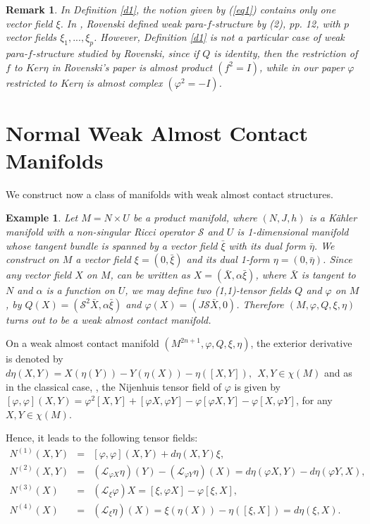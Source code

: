 \documentclass{article}
\newtheorem{example}[theorem]{Example}
\newtheorem{remark}[theorem]{Remark}
\begin{document}
\begin{remark}
 In Definition \ref{d1},  the notion given by (\ref{eq1}) contains only one vector field $\xi$. In \cite{Rov55}, Rovenski  defined  weak para-$f$-structure by (2), pp. 12, with $p$ vector fields $\xi_1, ..., \xi_p$. However, Definition \ref{d1} is not a particular case of weak para-$f$-structure studied by Rovenski, since if $Q$ is identity, then the restriction of $f$ to $Ker \eta$ in Rovenski's paper  is almost product $(f^2 = I)$, while in our paper $\varphi$ restricted to $Ker \eta$ is almost complex $(\varphi ^2 = - I)$.	
\end{remark} 









\section{Normal Weak Almost Contact Manifolds}
\noindent We construct now a class of manifolds with weak almost contact structures.

\begin{example} \label{ex1}
	Let $M=N\times U$ be a product manifold, where $(N,J,h)$ is a K\"{a}hler manifold with a non-singular Ricci operator $\mathcal{S}$ and $U$ is 1-dimensional manifold whose tangent bundle is spanned by a vector field ${\bar{\xi}}$ with its dual form $\bar{\eta}$. We construct on $M$ a vector field $\xi=(0,\bar{\xi})$ and its dual 1-form $\eta=(0,\bar{\eta})$. Since any vector field $X$ on $M$, can be written as $X=(\bar{X},\alpha\bar{\xi})$, where $\bar{X}$ is tangent to $N$ and $\alpha$ is a function on $U$, we may define two (1,1)-tensor fields $Q$ and $\varphi$ on $M$, by $Q (X)=(\mathcal{S}^2\bar{X},\alpha\bar{\xi})$ and $\varphi (X)=(J\mathcal{S}\bar{X},0)$. Therefore $(M,\varphi,Q,\xi,\eta)$ turns out to be a weak almost contact manifold.	
\end{example} 

On a weak almost contact manifold $(M^{2n+1},\varphi,Q,\xi,\eta)$, the exterior derivative is denoted by $d\eta(X,Y)=X(\eta(Y))-Y(\eta(X))-\eta([X,Y]), \ \ X,Y\in\chi(M)$ and as in the classical case, \cite{Blair},  the Nijenhuis tensor field of $\varphi$ is given by $[\varphi,\varphi](X,Y)=\varphi^2[X,Y]+[\varphi X,\varphi Y]-\varphi[\varphi X,Y]-\varphi[X,\varphi Y]$, for any $ X,Y\in\chi(M)$. \medskip

Hence, it leads to the following tensor fields:
\begin{eqnarray}
		N^{(1)}(X,Y)&=&[\varphi,\varphi](X,Y)+d\eta(X,Y)\xi,  \label{n1}\\
		 N^{(2)}(X,Y)&=& (\mathcal{L}_{\varphi X}\eta)(Y)-(\mathcal{L}_{\varphi Y}\eta)(X)=d\eta(\varphi X,Y)-d\eta(\varphi Y,X), \label{n2}\\
		 N^{(3)}(X)&=& (\mathcal{L}_{\xi}\varphi)X=[\xi,\varphi X]-\varphi[\xi,X], \label{n3}\\
		 N^{(4)}(X)&=& (\mathcal{L}_{\xi}\eta)(X)=\xi(\eta(X))-\eta([\xi,X])=d\eta(\xi,X). \label{n4}
\end{eqnarray}
\end{document}
